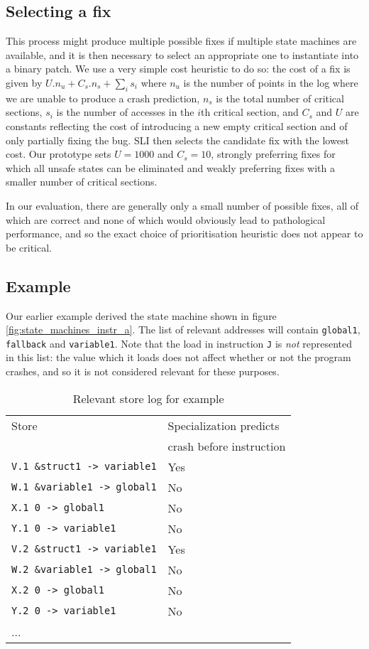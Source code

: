 \documentclass[10pt,twocolumn,preprint,natbib,authoryear]{sigplanconf}
\begin{document}
\subsection{Selecting a fix}
\label{sect:selectfix}

This process might produce multiple possible fixes if multiple state
machines are available, and it is then necessary to select an
appropriate one to instantiate into a binary patch.  We use a very
simple cost heuristic to do so: the cost of a fix is given by $U.n_u +
C_s.n_s + {\sum_{i}}s_i$ where $n_u$ is the number of points in the
log where we are unable to produce a crash prediction, $n_s$ is the
total number of critical sections, $s_i$ is the number of accesses in
the $i$th critical section, and $C_s$ and $U$ are constants reflecting
the cost of introducing a new empty critical section and of only
partially fixing the bug.  SLI then selects the candidate fix with the
lowest cost.  Our prototype sets $U=1000$ and $C_s=10$, strongly
preferring fixes for which all unsafe states can be eliminated and
weakly preferring fixes with a smaller number of critical sections.

In our evaluation, there are generally only a small number of possible
fixes, all of which are correct and none of which would obviously lead
to pathological performance, and so the exact choice of prioritisation
heuristic does not appear to be critical.

\subsection{Example}
\label{sect:final_example}

Our earlier example derived the state machine shown in figure
\ref{fig:state_machines_instr_a}.  The list of relevant addresses will
contain \verb|global1|, \verb|fallback| and \verb|variable1|.
Note that the load in instruction \verb|J| is \emph{not} represented
in this list: the value which it loads does not affect whether or not
the program crashes, and so it is not considered relevant for these
purposes.

\begin{table}
\begin{tabular}{ll}
 Store & Specialization predicts \\
       & crash before instruction \\
\verb|V.1 &struct1 -> variable1| & Yes\\
\verb|W.1 &variable1 -> global1| & No\\
\verb|X.1 0 -> global1| & No\\
\verb|Y.1 0 -> variable1| & No\\
\verb|V.2 &struct1 -> variable1| & Yes\\
\verb|W.2 &variable1 -> global1| & No\\
\verb|X.2 0 -> global1| & No\\
\verb|Y.2 0 -> variable1| & No\\
...
\end{tabular}
\caption{Relevant store log for example}
\label{fig:relevant_stores}
\end{table}
\end{document}
